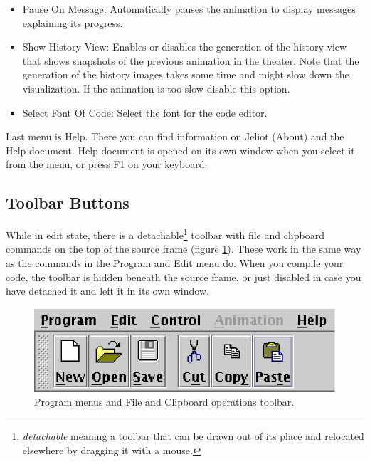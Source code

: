 \documentclass[a4paper,11pt,english]{article}
\newcommand{\jel}{Jeliot}
\newcommand{\bu}[1]{\textsf{#1}}
\newcommand{\menu}{\bu}
\begin{document}
{\begin{itemize}
\item \menu{Pause On Message}: Automatically pauses the animation to display messages
explaining its progress.

\item \menu{Show History View}: Enables or disables the generation of the history view that
shows snapshots of the previous animation in the theater. Note that the generation of
the history images takes some time and might slow down the visualization. If the animation
is too slow disable this option.

\item \menu{Select Font Of Code}: Select the font for the code editor.

\end{itemize}

Last menu is \menu{Help}. There you can find information on \jel{} (\menu{About}) and the \menu{Help} document. Help document is opened on its own window when you select it from the menu, or press \bu{F1} on your keyboard.

\subsection{Toolbar Buttons}
\label{toolbar}

While in edit state, there is a detachable\footnote{\emph{detachable} meaning a toolbar that can be drawn out of its place and relocated elsewhere by dragging it with a mouse.} toolbar with file and clipboard commands on the top of the source frame (figure \ref{fig:menutoolbar}). These work in the same way as the commands in the \menu{Program} and \menu{Edit} menu do. When you compile your code, the toolbar is hidden beneath the source frame, or just disabled in case you have detached it and left it in its own window.

\begin{figure}[ht]
\begin{center}
\includegraphics{images/menu_toolbar.eps}
\caption{\label{fig:menutoolbar}Program menus and File and Clipboard operations toolbar.}
\end{center}
\end{figure}

}
\end{document}
